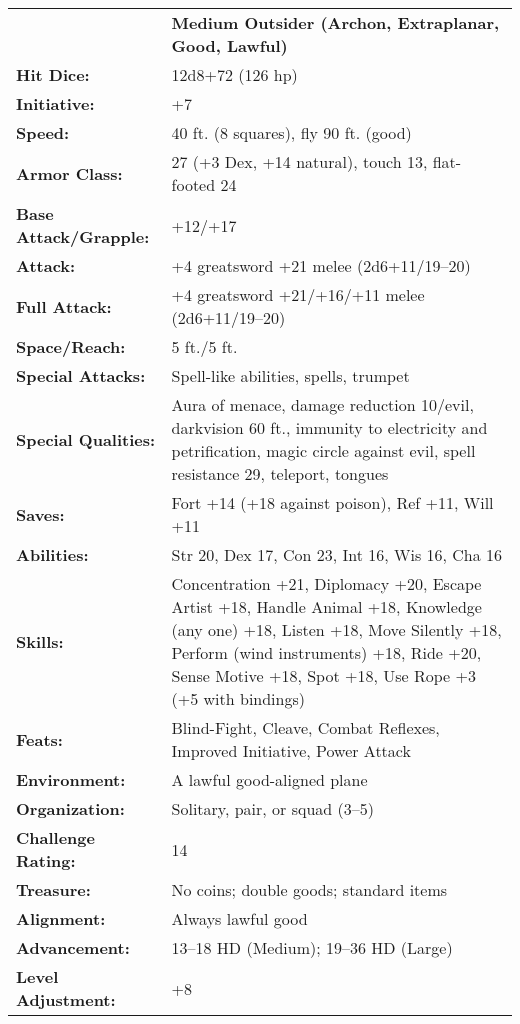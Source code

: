 \documentclass[../main.tex]{subfiles}
\begin{document}
  \begin{table}[H]
    \centering
    \begin{tabular}{p{9em}p{12em}}
       & \textbf{Medium Outsider (Archon, Extraplanar, Good, Lawful)} \\
      \textbf{Hit Dice:} & 12d8+72 (126 hp) \\
      \textbf{Initiative:} & +7 \\
      \textbf{Speed:} & 40 ft. (8 squares), fly 90 ft. (good) \\
      \textbf{Armor Class:} & 27 (+3 Dex, +14 natural), touch 13, flat-footed 24 \\
      \textbf{Base Attack/Grapple:} & +12/+17 \\
      \textbf{Attack:} & +4 greatsword +21 melee (2d6+11/19–20) \\
      \textbf{Full Attack:} & +4 greatsword +21/+16/+11 melee (2d6+11/19–20) \\
      \textbf{Space/Reach:} & 5 ft./5 ft. \\
      \textbf{Special Attacks:} & Spell-like abilities, spells, trumpet \\
      \textbf{Special Qualities:} & Aura of menace, damage reduction 10/evil, darkvision 60 ft., immunity to electricity and petrification, magic circle against evil, spell resistance 29, teleport, tongues \\
      \textbf{Saves:} & Fort +14 (+18 against poison), Ref +11, Will +11 \\
      \textbf{Abilities:} & Str 20, Dex 17, Con 23, Int 16, Wis 16, Cha 16 \\
      \textbf{Skills:} & Concentration +21, Diplomacy +20, Escape Artist +18, Handle Animal +18, Knowledge (any one) +18, Listen +18, Move Silently +18, Perform (wind instruments) +18, Ride +20, Sense Motive +18, Spot +18, Use Rope +3 (+5 with bindings) \\
      \textbf{Feats:} & Blind-Fight, Cleave, Combat Reflexes, Improved Initiative, Power Attack \\
      \textbf{Environment:} & A lawful good-aligned plane \\
      \textbf{Organization:} & Solitary, pair, or squad (3–5) \\
      \textbf{Challenge Rating:} & 14 \\
      \textbf{Treasure:} & No coins; double goods; standard items \\
      \textbf{Alignment:} & Always lawful good \\
      \textbf{Advancement:} & 13–18 HD (Medium); 19–36 HD (Large) \\
      \textbf{Level Adjustment:} & +8 \\
    \end{tabular}
  \end{table}
\end{document}
